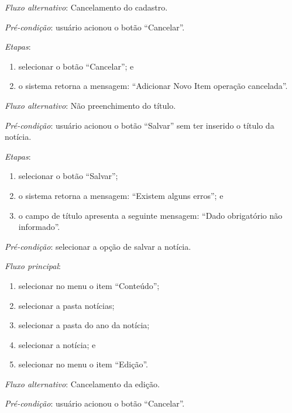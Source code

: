 \noindent \textit{Fluxo alternativo}: Cancelamento do cadastro.

\noindent \textit{Pré-condição}:  usuário acionou o botão ``Cancelar''.

\noindent \textit{Etapas}:

\begin{enumerate}
    \item selecionar o botão ``Cancelar''; e
    \item o sistema retorna a mensagem: ``Adicionar Novo Item operação cancelada''.
\end{enumerate}

\noindent \textit{Fluxo alternativo}: Não preenchimento do título.

\noindent \textit{Pré-condição}: usuário acionou o botão ``Salvar'' sem ter inserido o título da notícia.

\noindent \textit{Etapas}:

\begin{enumerate}
    \item selecionar o botão ``Salvar'';
    \item o sistema retorna a mensagem: ``Existem alguns erros''; e
    \item o campo de título apresenta a seguinte mensagem: ``Dado obrigatório não informado''.
\end{enumerate}




\vspace{0.7cm}

\noindent \textit{Pré-condição}: selecionar a opção de salvar a notícia.

\noindent \textit{Fluxo principal}:

\begin{enumerate}
    \item selecionar no menu o item ``Conteúdo'';
    \item selecionar a pasta notícias;
    \item selecionar a pasta do ano da notícia;
    \item selecionar a notícia; e
    \item selecionar no menu o item ``Edição''.
\end{enumerate}

\noindent \textit{Fluxo alternativo}: Cancelamento da edição.

\noindent \textit{Pré-condição}: usuário acionou o botão ``Cancelar''.

